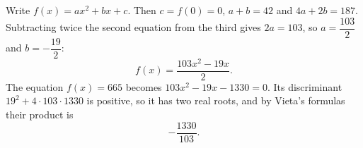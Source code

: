 Write $f(x)=ax^2+bx+c$. Then $c=f(0)=0$, $a+b=42$ and $4a+2b=187$. Subtracting twice the second equation from the third gives $2a=103$, so $a=\dfrac{103}{2}$ and $b=-\dfrac{19}{2}$:
\[f(x)=\dfrac{103x^2-19x}{2}.\]
The equation $f(x)=665$ becomes $103x^2-19x-1330=0$. Its discriminant $19^2+4\cdot103\cdot1330$ is positive, so it has two real roots, and by Vieta's formulas their product is
\[\boxed{-\dfrac{1330}{103}}.\]

